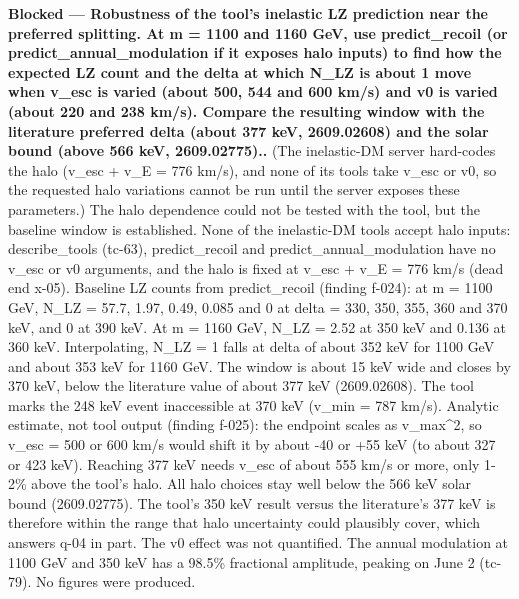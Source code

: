 \documentclass[11pt,a4paper]{article}
\begin{document}
\textbf{Blocked --- Robustness of the tool's inelastic LZ prediction near the preferred splitting. At m = 1100 and 1160 GeV, use predict\_recoil (or predict\_annual\_modulation if it exposes halo inputs) to find how the expected LZ count and the delta at which N\_LZ is about 1 move when v\_esc is varied (about 500, 544 and 600 km/s) and v0 is varied (about 220 and 238 km/s). Compare the resulting window with the literature preferred delta (about 377 keV, 2609.02608) and the solar bound (above 566 keV, 2609.02775)..} (The inelastic-DM server hard-codes the halo (v\_esc + v\_E = 776 km/s), and none of its tools take v\_esc or v0, so the requested halo variations cannot be run until the server exposes these parameters.) The halo dependence could not be tested with the tool, but the baseline window is established. None of the inelastic-DM tools accept halo inputs: describe\_tools (tc-63), predict\_recoil and predict\_annual\_modulation have no v\_esc or v0 arguments, and the halo is fixed at v\_esc + v\_E = 776 km/s (dead end x-05). Baseline LZ counts from predict\_recoil (finding f-024): at m = 1100 GeV, N\_LZ = 57.7, 1.97, 0.49, 0.085 and 0 at delta = 330, 350, 355, 360 and 370 keV, and 0 at 390 keV. At m = 1160 GeV, N\_LZ = 2.52 at 350 keV and 0.136 at 360 keV. Interpolating, N\_LZ = 1 falls at delta of about 352 keV for 1100 GeV and about 353 keV for 1160 GeV. The window is about 15 keV wide and closes by 370 keV, below the literature value of about 377 keV (2609.02608). The tool marks the 248 keV event inaccessible at 370 keV (v\_min = 787 km/s). Analytic estimate, not tool output (finding f-025): the endpoint scales as v\_max\textasciicircum{}2, so v\_esc = 500 or 600 km/s would shift it by about -40 or +55 keV (to about 327 or 423 keV). Reaching 377 keV needs v\_esc of about 555 km/s or more, only 1-2\% above the tool's halo. All halo choices stay well below the 566 keV solar bound (2609.02775). The tool's 350 keV result versus the literature's 377 keV is therefore within the range that halo uncertainty could plausibly cover, which answers q-04 in part. The v0 effect was not quantified. The annual modulation at 1100 GeV and 350 keV has a 98.5\% fractional amplitude, peaking on June 2 (tc-79). No figures were produced.
\end{document}
